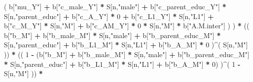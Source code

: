 \documentclass[
]{book}
\newenvironment{Shaded}{\begin{snugshade}}{\end{snugshade}}
\newcommand{\DecValTok}[1]{\textcolor[rgb]{0.00,0.00,0.81}{#1}}
\newcommand{\NormalTok}[1]{#1}
\newcommand{\SpecialCharTok}[1]{\textcolor[rgb]{0.81,0.36,0.00}{\textbf{#1}}}
\newcommand{\StringTok}[1]{\textcolor[rgb]{0.31,0.60,0.02}{#1}}
\begin{document}
\begin{Shaded}
\begin{Highlighting}[]
\NormalTok{                           ( b[}\StringTok{"mu\_Y"}\NormalTok{] }\SpecialCharTok{+} 
\NormalTok{                               b[}\StringTok{"c\_male\_Y"}\NormalTok{] }\SpecialCharTok{*}\NormalTok{ S[n,}\StringTok{"male"}\NormalTok{] }\SpecialCharTok{+} 
\NormalTok{                               b[}\StringTok{"c\_parent\_educ\_Y"}\NormalTok{] }\SpecialCharTok{*}\NormalTok{ S[n,}\StringTok{"parent\_educ"}\NormalTok{] }\SpecialCharTok{+} 
\NormalTok{                               b[}\StringTok{"c\_A\_Y"}\NormalTok{] }\SpecialCharTok{*} \DecValTok{0} \SpecialCharTok{+} 
\NormalTok{                               b[}\StringTok{"c\_L1\_Y"}\NormalTok{] }\SpecialCharTok{*}\NormalTok{ S[n,}\StringTok{"L1"}\NormalTok{] }\SpecialCharTok{+}
\NormalTok{                               b[}\StringTok{"c\_M\_Y"}\NormalTok{] }\SpecialCharTok{*}\NormalTok{ S[n,}\StringTok{"M"}\NormalTok{] }\SpecialCharTok{+} 
\NormalTok{                               b[}\StringTok{"c\_AM\_Y"}\NormalTok{] }\SpecialCharTok{*} \DecValTok{0} \SpecialCharTok{*}\NormalTok{ S[n,}\StringTok{"M"}\NormalTok{] }\SpecialCharTok{*}\NormalTok{ b[}\StringTok{"A.M.inter"}\NormalTok{] ) ) }\SpecialCharTok{*}
\NormalTok{      (( b[}\StringTok{"b\_M"}\NormalTok{] }\SpecialCharTok{+} 
\NormalTok{           b[}\StringTok{"b\_male\_M"}\NormalTok{] }\SpecialCharTok{*}\NormalTok{ S[n,}\StringTok{"male"}\NormalTok{] }\SpecialCharTok{+} 
\NormalTok{           b[}\StringTok{"b\_parent\_educ\_M"}\NormalTok{] }\SpecialCharTok{*}\NormalTok{ S[n,}\StringTok{"parent\_educ"}\NormalTok{] }\SpecialCharTok{+} 
\NormalTok{           b[}\StringTok{"b\_L1\_M"}\NormalTok{] }\SpecialCharTok{*}\NormalTok{ S[n,}\StringTok{"L1"}\NormalTok{] }\SpecialCharTok{+}
\NormalTok{           b[}\StringTok{"b\_A\_M"}\NormalTok{] }\SpecialCharTok{*} \DecValTok{0}\NormalTok{ )}\SpecialCharTok{\^{}}\NormalTok{( S[n,}\StringTok{"M"}\NormalTok{] )) }\SpecialCharTok{*} 
\NormalTok{      (( }\DecValTok{1} \SpecialCharTok{{-}}\NormalTok{ (b[}\StringTok{"b\_M"}\NormalTok{] }\SpecialCharTok{+} 
\NormalTok{                b[}\StringTok{"b\_male\_M"}\NormalTok{] }\SpecialCharTok{*}\NormalTok{ S[n,}\StringTok{"male"}\NormalTok{] }\SpecialCharTok{+} 
\NormalTok{                b[}\StringTok{"b\_parent\_educ\_M"}\NormalTok{] }\SpecialCharTok{*}\NormalTok{ S[n,}\StringTok{"parent\_educ"}\NormalTok{] }\SpecialCharTok{+} 
\NormalTok{                b[}\StringTok{"b\_L1\_M"}\NormalTok{] }\SpecialCharTok{*}\NormalTok{ S[n,}\StringTok{"L1"}\NormalTok{] }\SpecialCharTok{+}
\NormalTok{                b[}\StringTok{"b\_A\_M"}\NormalTok{] }\SpecialCharTok{*} \DecValTok{0}\NormalTok{) )}\SpecialCharTok{\^{}}\NormalTok{( }\DecValTok{1} \SpecialCharTok{{-}}\NormalTok{ S[n,}\StringTok{"M"}\NormalTok{] ))  }\SpecialCharTok{*}

\end{Highlighting}
\end{Shaded}
\end{document}
